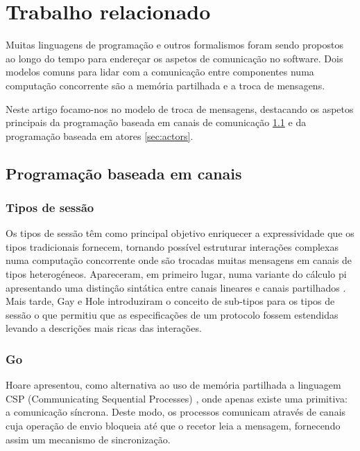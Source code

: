 
\section{Trabalho relacionado}
\label{sec:rel-work}

Muitas linguagens de programação e outros formalismos foram sendo propostos ao longo do tempo para endereçar os aspetos de comunicação no software. Dois modelos comuns para lidar com a comunicação entre componentes numa computação concorrente são a memória partilhada e a troca de mensagens.

Neste artigo focamo-nos no modelo de troca de mensagens, destacando os aspetos principais da programação baseada em canais de comunicação \ref{sec:prog-chan} e da programação baseada em atores \ref{sec:actors}.

\subsection{Programação baseada em canais}
\label{sec:prog-chan}

\subsubsection{Tipos de sessão}
\label{sec:session-types} Os tipos de sessão têm como principal objetivo enriquecer a expressividade que os tipos tradicionais fornecem, tornando possível estruturar interações complexas numa computação
concorrente onde são trocadas muitas mensagens em canais de tipos heterogéneos. Apareceram, em primeiro lugar, numa variante do cálculo pi apresentando uma distinção sintática entre canais lineares e canais partilhados \cite{ref-lang-primitives}. Mais tarde, Gay e Hole \cite{ref-sessions-pi} introduziram o conceito de sub-tipos para os tipos de sessão o que permitiu que as especificações de um protocolo fossem estendidas levando a descrições mais ricas das interações.


\subsubsection{Go}
\label{sec:go}
\lstset{language=Golang}
Hoare apresentou, como alternativa ao uso de memória partilhada a linguagem CSP (Communicating Sequential Processes) \cite{ref-CSP-Hoare}, onde apenas existe uma primitiva: a comunicação síncrona. Deste modo, os processos comunicam através de canais cuja operação de envio bloqueia até que o recetor leia a mensagem, fornecendo assim um mecanismo de sincronização.

